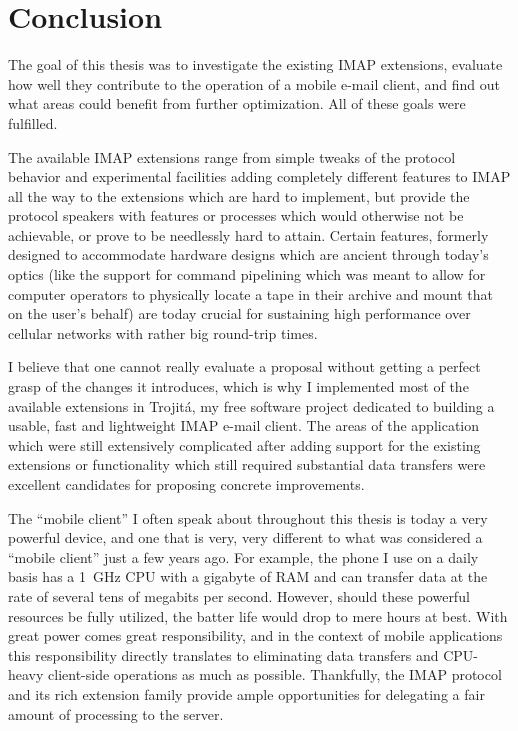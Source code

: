 \documentclass[trojita]{subfiles}
\begin{document}
\chapter{Conclusion}
\label{sec:conclusion}

The goal of this thesis was to investigate the existing IMAP extensions, evaluate how well they contribute to the
operation of a mobile e-mail client, and find out what areas could benefit from further optimization.  All of these
goals were fulfilled.

The available IMAP extensions range from simple tweaks of the protocol behavior and experimental facilities adding
completely different features to IMAP all the way to the extensions which are hard to implement, but provide the
protocol speakers with features or processes which would otherwise not be achievable, or prove to be needlessly hard to
attain.  Certain features, formerly designed to accommodate hardware designs which are ancient through today's optics
(like the support for command pipelining which was meant to allow for computer operators to physically locate a tape in
their archive and mount that on the user's behalf) are today crucial for sustaining high performance over cellular
networks with rather big round-trip times.

I believe that one cannot really evaluate a proposal without getting a perfect grasp of the changes it introduces, which
is why I implemented most of the available extensions in Trojitá, my free software project dedicated to building a
usable, fast and lightweight IMAP e-mail client.  The areas of the application which were still extensively complicated
after adding support for the existing extensions or functionality which still required substantial data transfers were
excellent candidates for proposing concrete improvements.

The ``mobile client'' I often speak about throughout this thesis is today a very powerful device, and one that is very,
very different to what was considered a ``mobile client'' just a few years ago.  For example, the phone I use on a daily
basis has a 1~GHz CPU with a gigabyte of RAM and can transfer data at the rate of several tens of megabits per second.
However, should these powerful resources be fully utilized, the batter life would drop to mere hours at best.  With
great power comes great responsibility, and in the context of mobile applications this responsibility directly
translates to eliminating data transfers and CPU-heavy client-side operations as much as possible.  Thankfully, the IMAP
protocol and its rich extension family provide ample opportunities for delegating a fair amount of processing to the
server.
\end{document}

